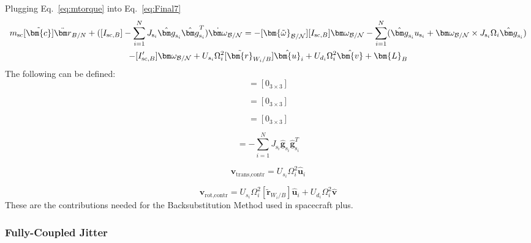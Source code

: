 Plugging Eq.~\eqref{eq:mtorque} into Eq.~\eqref{eq:Final7}
\begin{multline}
m_{\text{sc}}[\tilde{\bm{c}}] \ddot{\bm r}_{B/N}
+([I_{\text{sc},B}]-\sum_{i=1}^{N}J_{\text{s}_i} \hat{\bm g}_{\text{s}_i} \hat{\bm g}_{\text{s}_i}^T) \dot{\bm\omega}_{\cal B/N}
= -[\bm{\tilde{\omega}}_{\cal B/N}] [I_{\text{sc},B}] \bm\omega_{\cal B/N} - \sum_{i=1}^{N}(\hat{\bm g}_{\text{s}_i} u_{\text{s}_i} + \bm\omega_{\cal B/N}\times J_{\text{s}_i}\Omega_i\hat{\bm g}_{\text{s}_i})
\\- [I'_{\text{sc},B}] \bm\omega_{\cal B/N} + U_{s_i}\Omega_i^2[\tilde{\bm{r}}_{W_i/B}]\hat{\bm{u}}_i + U_{d_i}\Omega_i^2\hat{\bm{v}} + \bm{L}_B
\label{eq:Final72}
\end{multline}
The following can be defined:
\begin{equation}
[A_\text{contr}] = [0_{3 \times 3}]
\end{equation}

\begin{equation}
[B_\text{contr}] = [0_{3 \times 3}]
\end{equation}

\begin{equation}
[C_\text{contr}] = [0_{3 \times 3}]
\end{equation}

\begin{equation}
[D_\text{contr}] = -\sum_{i=1}^{N}J_{\text{s}_i} \hat{\bm g}_{\text{s}_i} \hat{\bm g}_{\text{s}_i}^T
\end{equation}

\begin{equation}
\bm v_{\text{trans,contr}} = U_{s_i}\Omega_i^2\hat{\bm{u}}_i
\end{equation}

\begin{equation}
\bm v_{\text{rot,contr}} =  U_{s_i}\Omega_i^2[\tilde{\bm{r}}_{W_i/B}]\hat{\bm{u}}_i + U_{d_i}\Omega_i^2\hat{\bm{v}}
\end{equation}
These are the contributions needed for the Backsubstitution Method used in spacecraft plus.

\subsubsection{Fully-Coupled Jitter}

